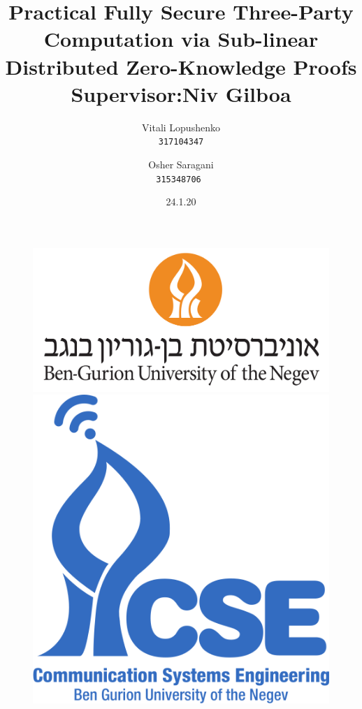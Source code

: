 \documentclass[12pt]{article}
\title{\textbf{Practical Fully Secure Three-Party Computation via Sub-linear Distributed Zero-Knowledge Proofs} \break\break Supervisor:\break Niv Gilboa \break}
\author{  Vitali Lopushenko\\
	\texttt{317104347}
	\and
	Osher Saragani\\
	\texttt{315348706}\
	\date{24.1.20}
	}
\begin{document}
\begin{figure}
	\begin{minipage}[c]{0.6\linewidth}
		\includegraphics[width=\linewidth]{a.png}
	\end{minipage}
	\hfill
	\begin{minipage}[c]{0.3\linewidth}
		\includegraphics[width=\linewidth]{cse_logo.png}
	\end{minipage}%
\end{figure}

\maketitle
\pagebreak
\tableofcontents
\pagebreak
\listoffigures
\listoftables
\pagebreak
\end{document}
